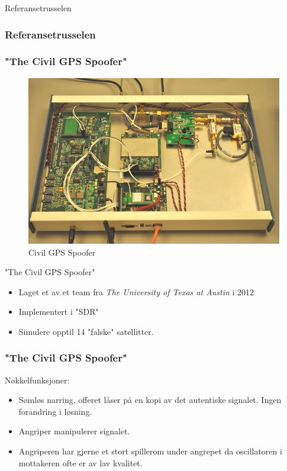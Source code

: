 \documentclass[xcolor=table]{beamer}
\begin{document}
\begin{frame}
\centering
Referansetrusselen
\end{frame}

\subsubsection{Referansetrusselen}
\begin{frame}
  \frametitle{"The Civil GPS Spoofer"}
  \begin{figure}
    \includegraphics[scale=0.2]{pics/texas_spoofer.jpg}
    \caption{Civil GPS Spoofer}
  \end{figure}
  "The Civil GPS Spoofer"
  \begin{itemize}
    \item Laget et av et team fra \textit{The University of Texas at Austin} i 2012 \cite{EVPMUGA}
    \item Implementert i "SDR"
    \item Simulere opptil 14 "falske" satellitter.
  \end{itemize}
\end{frame}

\begin{frame}
  \frametitle{"The Civil GPS Spoofer"}
  Nøkkelfunksjoner:
  \begin{itemize}
    \item Sømløs narring, offeret låser på en kopi av det autentiske signalet. Ingen forandring i løsning.
    \item Angriper manipulerer signalet.
    \item Angriperen har gjerne et stort spillerom under angrepet da oscillatoren i mottakeren ofte er av lav kvalitet.
  \end{itemize}
\end{frame}
\end{document}
